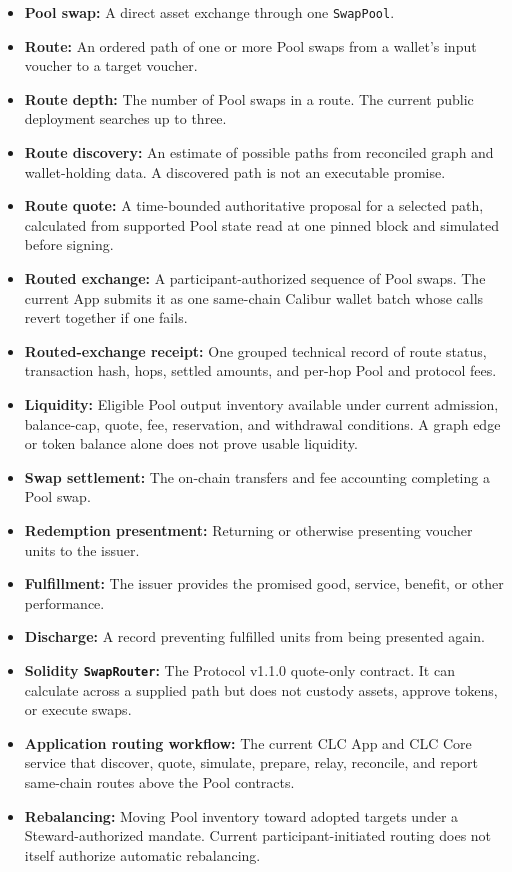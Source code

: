 \documentclass[11pt]{article}
\begin{document}
\begin{itemize}[leftmargin=*]
\item \textbf{Pool swap:} A direct asset exchange through one \texttt{SwapPool}.
\item \textbf{Route:} An ordered path of one or more Pool swaps from a wallet's input voucher to a target voucher.
\item \textbf{Route depth:} The number of Pool swaps in a route. The current public deployment searches up to three.
\item \textbf{Route discovery:} An estimate of possible paths from reconciled graph and wallet-holding data. A discovered path is not an executable promise.
\item \textbf{Route quote:} A time-bounded authoritative proposal for a selected path, calculated from supported Pool state read at one pinned block and simulated before signing.
\item \textbf{Routed exchange:} A participant-authorized sequence of Pool swaps. The current App submits it as one same-chain Calibur wallet batch whose calls revert together if one fails.
\item \textbf{Routed-exchange receipt:} One grouped technical record of route status, transaction hash, hops, settled amounts, and per-hop Pool and protocol fees.
\item \textbf{Liquidity:} Eligible Pool output inventory available under current admission, balance-cap, quote, fee, reservation, and withdrawal conditions. A graph edge or token balance alone does not prove usable liquidity.
\item \textbf{Swap settlement:} The on-chain transfers and fee accounting completing a Pool swap.
\item \textbf{Redemption presentment:} Returning or otherwise presenting voucher units to the issuer.
\item \textbf{Fulfillment:} The issuer provides the promised good, service, benefit, or other performance.
\item \textbf{Discharge:} A record preventing fulfilled units from being presented again.
\item \textbf{Solidity \texttt{SwapRouter}:} The Protocol v1.1.0 quote-only contract. It can calculate across a supplied path but does not custody assets, approve tokens, or execute swaps.
\item \textbf{Application routing workflow:} The current CLC App and CLC Core service that discover, quote, simulate, prepare, relay, reconcile, and report same-chain routes above the Pool contracts.
\item \textbf{Rebalancing:} Moving Pool inventory toward adopted targets under a Steward-authorized mandate. Current participant-initiated routing does not itself authorize automatic rebalancing.

\end{itemize}
\end{document}
